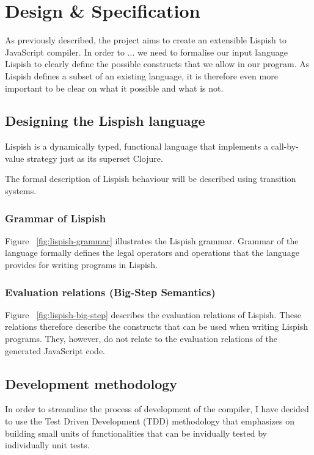 \chapter{Design \& Specification}

As previously described, the project aims to create an extensible Lispish to JavaScript compiler. 
In order to ... we need to formalise our input language Lispish to clearly define the possible constructs that we allow in our program. 
As Lispish defines a subset of an existing language, it is therefore even more important to be clear on what it possible and what is not. 

\section{Designing the Lispish language}

Lispish is a dynamically typed, functional language that implements a call-by-value strategy just as its superset Clojure.

The formal description of Lispish behaviour will be described using transition systems.

\subsection{Grammar of Lispish}



Figure ~\ref{fig:lispish-grammar} illustrates the Lispish grammar. Grammar of the language formally defines the legal operators and operations that the language provides for writing programs in Lispish.

\subsection{Evaluation relations (Big-Step Semantics)}

Figure ~\ref{fig:lispish-big-step} describes the evaluation relations of Lispish. These relations therefore describe the constructs that can be used when writing Lispish programs. They, however, do not relate to the evaluation relations of the generated JavaScript code. 



\section{Development methodology}
In order to streamline the process of development of the compiler, I have decided to use the Test Driven Development (TDD) methodology that emphasizes on building small units of functionalities that can be invidually tested by individually unit tests. 

